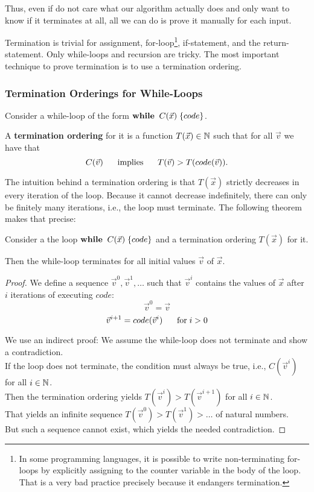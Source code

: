 Thus, even if do not care what our algorithm actually does and only want to know if it terminates at all, all we can do is prove it manually for each input.

Termination is trivial for assignment, for-loop\footnote{In some programming languages, it is possible to write non-terminating for-loops by explicitly assigning to the counter variable in the body of the loop. That is a very bad practice precisely because it endangers termination.}, if-statement, and the return-statement.
Only while-loops and recursion are tricky.
The most important technique to prove termination is to use a termination ordering.

\subsubsection{Termination Orderings for While-Loops}

\begin{definition}\label{sec:def:termord}
Consider a while-loop of the form $\awhileI{C(\vec{x})}{code}$.

A \textbf{termination ordering} for it is a function $T(\vec{x})\in\mathbb{N}$ such that for all $\vec{v}$ we have that
\[C(\vec{v}) \hspace*{.5cm}\;\mathrm{implies}\;\hspace*{.5cm} T(\vec{v})>T(code(\vec{v})).\]
\end{definition}

The intuition behind a termination ordering is that $T(\vec{x})$ strictly decreases in every iteration of the loop.
Because it cannot decrease indefinitely, there can only be finitely many iterations, i.e., the loop must terminate.
The following theorem makes that precise:

\begin{theorem}\label{sec:thm:termord}
Consider a the loop $\awhileI{C(\vec{x})}{code}$ and a termination ordering $T(\vec{x})$ for it.

Then the while-loop terminates for all initial values $\vec{v}$ of $\vec{x}$.
\end{theorem}
\begin{proof}
We define a sequence $\vec{v}^0, \vec{v}^1, \ldots$ such that $\vec{v}^i$ contains the values of $\vec{x}$ after $i$ iterations of executing $code$:
\[\vec{v}^0=\vec{v}\]
\[\vec{v}^{i+1}=code(\vec{v}^i) \hspace*{.5cm} \;\mathrm{for}\; i>0\]
\medskip

We use an indirect proof: We assume the while-loop does not terminate and show a contradiction.\\
If the loop does not terminate, the condition must always be true, i.e., $C(\vec{v}^i)$ for all $i\in\mathbb{N}$.\\
Then the termination ordering yields $T(\vec{v}^i)>T(\vec{v}^{i+1})$ for all $i\in\mathbb{N}$.\\
That yields an infinite sequence $T(\vec{v}^0) > T(\vec{v}^1) > \ldots $ of natural numbers.\\
But such a sequence cannot exist, which yields the needed contradiction.
\end{proof}


